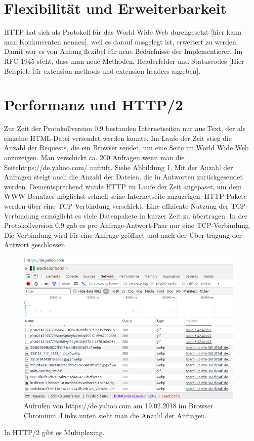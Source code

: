 \documentclass{llncs}
\begin{document}
\section{Flexibilität und Erweiterbarkeit}
HTTP hat sich als Protokoll für das World Wide Web durchgesetzt [hier kann man Konkurrenten nennen], weil es darauf ausgelegt ist, erweitert zu werden. Damit war es von Anfang flexibel für neue Bedürfnisse der Implementierer. Im RFC 1945 steht, dass man neue Methoden, Headerfelder und Statuscodes 
[Hier Beispiele für extension methods und extension headers angeben].
\section{Performanz und HTTP/2}
Zur Zeit der Protokollversion 0.9 bestanden Internetseiten nur aus Text, der als einzelne HTML-Datei versendet werden konnte. Im Laufe der Zeit stieg die Anzahl der Requests, die ein Browser sendet, um eine Seite im World Wide Web anzuzeigen. Man verschickt ca. 200 Anfragen wenn man die Seite\linebreak https://de.yahoo.com/ aufruft. Siehe Abbildung 1. Mit der Anzahl der Anfragen steigt auch die Anzahl der Dateien, die in Antworten zurückgesendet werden. Dementsprechend wurde HTTP im Laufe der Zeit angepasst, um dem WWW-Benutzer möglichst schnell seine Internetseite anzuzeigen. HTTP-Pakete werden über eine TCP-Verbindung verschickt. Eine effiziente Nutzung der TCP-Verbindung ermöglicht es viele Datenpakete in kurzer Zeit zu übertragen.\newline
In der Protokollversion 0.9 gab es pro Anfrage-Antwort-Paar nur eine TCP-Verbindung. Die Verbindung wird für eine Anfrage geöffnet und nach der Über-tragung der Antwort geschlossen.  

\begin{figure}
\includegraphics[width=\columnwidth]{yahooRequests}
\caption{Aufrufen von https://de.yahoo.com am 19.02.2018 im Browser Chromium. Links unten sieht man die Anzahl der Anfragen.}
\end{figure}

  
In HTTP/2 gibt es Multiplexing.\cite{Belshe2015}


\end{document}
